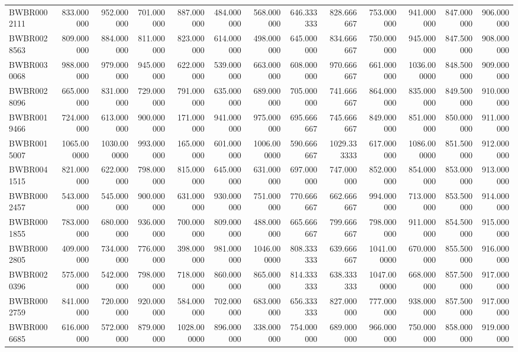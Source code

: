 \begin{longtable}{lrrrrrrrrrrrr}
BWBR0002111 & 833.000000 & 952.000000 & 701.000000 & 887.000000 & 484.000000 & 568.000000 & 646.333333 & 828.666667 & 753.000000 & 941.000000 & 847.000000 & 906.000000 \\
BWBR0028563 & 809.000000 & 884.000000 & 811.000000 & 823.000000 & 614.000000 & 498.000000 & 645.000000 & 834.666667 & 750.000000 & 945.000000 & 847.500000 & 908.000000 \\
BWBR0030068 & 988.000000 & 979.000000 & 945.000000 & 622.000000 & 539.000000 & 663.000000 & 608.000000 & 970.666667 & 661.000000 & 1036.000000 & 848.500000 & 909.000000 \\
BWBR0028096 & 665.000000 & 831.000000 & 729.000000 & 791.000000 & 635.000000 & 689.000000 & 705.000000 & 741.666667 & 864.000000 & 835.000000 & 849.500000 & 910.000000 \\
BWBR0019466 & 724.000000 & 613.000000 & 900.000000 & 171.000000 & 941.000000 & 975.000000 & 695.666667 & 745.666667 & 849.000000 & 851.000000 & 850.000000 & 911.000000 \\
BWBR0015007 & 1065.000000 & 1030.000000 & 993.000000 & 165.000000 & 601.000000 & 1006.000000 & 590.666667 & 1029.333333 & 617.000000 & 1086.000000 & 851.500000 & 912.000000 \\
BWBR0041515 & 821.000000 & 622.000000 & 798.000000 & 815.000000 & 645.000000 & 631.000000 & 697.000000 & 747.000000 & 852.000000 & 854.000000 & 853.000000 & 913.000000 \\
BWBR0002457 & 543.000000 & 545.000000 & 900.000000 & 631.000000 & 930.000000 & 751.000000 & 770.666667 & 662.666667 & 994.000000 & 713.000000 & 853.500000 & 914.000000 \\
BWBR0001855 & 783.000000 & 680.000000 & 936.000000 & 700.000000 & 809.000000 & 488.000000 & 665.666667 & 799.666667 & 798.000000 & 911.000000 & 854.500000 & 915.000000 \\
BWBR0002805 & 409.000000 & 734.000000 & 776.000000 & 398.000000 & 981.000000 & 1046.000000 & 808.333333 & 639.666667 & 1041.000000 & 670.000000 & 855.500000 & 916.000000 \\
BWBR0020396 & 575.000000 & 542.000000 & 798.000000 & 718.000000 & 860.000000 & 865.000000 & 814.333333 & 638.333333 & 1047.000000 & 668.000000 & 857.500000 & 917.000000 \\
BWBR0002759 & 841.000000 & 720.000000 & 920.000000 & 584.000000 & 702.000000 & 683.000000 & 656.333333 & 827.000000 & 777.000000 & 938.000000 & 857.500000 & 917.000000 \\
BWBR0006685 & 616.000000 & 572.000000 & 879.000000 & 1028.000000 & 896.000000 & 338.000000 & 754.000000 & 689.000000 & 966.000000 & 750.000000 & 858.000000 & 919.000000 \\

\end{longtable}
